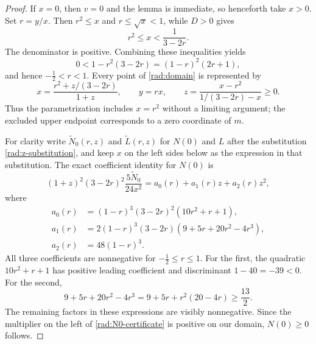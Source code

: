 \begin{proof}
If $x=0$, then $v=0$ and the lemma is immediate, so henceforth take $x>0$.
Set $r=y/x$.  Then $r^2\leq x$ and $r\leq\sqrt{x}<1$, while $D>0$ gives
\begin{equation}\label{rad:domain}
 r^2\leq x<\frac1{3-2r}.
\end{equation}
The denominator is positive.  Combining these inequalities yields
\[
 0<1-r^2(3-2r)=(1-r)^2(2r+1),
\]
and hence $-\frac12<r<1$.  Every point of \eqref{rad:domain} is represented by
\begin{equation}\label{rad:z-substitution}
 x=\frac{r^2+z/(3-2r)}{1+z},\qquad y=rx,\qquad
 z=\frac{x-r^2}{1/(3-2r)-x}\geq0.
\end{equation}
Thus the parametrization includes $x=r^2$ without a limiting argument;
the excluded upper endpoint corresponds to a zero coordinate of $m$.

For clarity write $\widetilde N_0(r,z)$ and $\widetilde L(r,z)$ for $N(0)$
and $L$ after the substitution \eqref{rad:z-substitution}, and keep $x$
on the left sides below as the expression in that substitution.  The exact
coefficient identity for $N(0)$ is
\begin{equation}\label{rad:N0-certificate}
 (1+z)^2(3-2r)^2\frac{5\widetilde N_0}{24x^2}
   =a_0(r)+a_1(r)z+a_2(r)z^2,
\end{equation}
where
\begin{align*}
 a_0(r)&=(1-r)^3(3-2r)^2(10r^2+r+1),\\
 a_1(r)&=2(1-r)^3(3-2r)(9+5r+20r^2-4r^3),\\
 a_2(r)&=48(1-r)^3.
\end{align*}
All three coefficients are nonnegative for $-\frac12\leq r\leq1$.
For the first, the quadratic $10r^2+r+1$ has positive leading coefficient
and discriminant $1-40=-39<0$.  For the second,
\[
 9+5r+20r^2-4r^3=9+5r+r^2(20-4r)\geq\frac{13}{2}.
\]
The remaining factors in these expressions are visibly nonnegative.
Since the multiplier on the left of \eqref{rad:N0-certificate} is positive
on our domain, $N(0)\geq0$ follows.


\end{proof}
